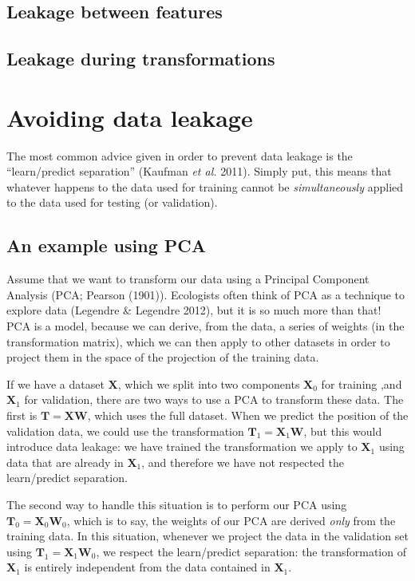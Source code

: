 \documentclass[
  letterpaper,
]{scrbook}
\begin{document}
\subsection{Leakage between features}\label{leakage-between-features}

\subsection{Leakage during
transformations}\label{leakage-during-transformations}

\section{Avoiding data leakage}\label{leakage-sec-leakage-avoid}

The most common advice given in order to prevent data leakage is the
``learn/predict separation'' (Kaufman \emph{et al.} 2011). Simply put,
this means that whatever happens to the data used for training cannot be
\emph{simultaneously} applied to the data used for testing (or
validation).

\subsection{An example using PCA}\label{an-example-using-pca}

Assume that we want to transform our data using a Principal Component
Analysis (PCA; Pearson (1901)). Ecologists often think of PCA as a
technique to explore data (Legendre \& Legendre 2012), but it is so much
more than that! PCA is a model, because we can derive, from the data, a
series of weights (in the transformation matrix), which we can then
apply to other datasets in order to project them in the space of the
projection of the training data.

If we have a dataset \(\mathbf{X}\), which we split into two components
\(\mathbf{X}_0\) for training ,and \(\mathbf{X}_1\) for validation,
there are two ways to use a PCA to transform these data. The first is
\(\mathbf{T} = \mathbf{X}\mathbf{W}\), which uses the full dataset. When
we predict the position of the validation data, we could use the
transformation \(\mathbf{T}_1 = \mathbf{X}_1\mathbf{W}\), but this would
introduce data leakage: we have trained the transformation we apply to
\(\mathbf{X}_1\) using data that are already in \(\mathbf{X}_1\), and
therefore we have not respected the learn/predict separation.

The second way to handle this situation is to perform our PCA using
\(\mathbf{T}_0 = \mathbf{X}_0\mathbf{W}_0\), which is to say, the
weights of our PCA are derived \emph{only} from the training data. In
this situation, whenever we project the data in the validation set using
\(\mathbf{T}_1 = \mathbf{X}_1\mathbf{W}_0\), we respect the
learn/predict separation: the transformation of \(\mathbf{X}_1\) is
entirely independent from the data contained in \(\mathbf{X}_1\).
\end{document}
